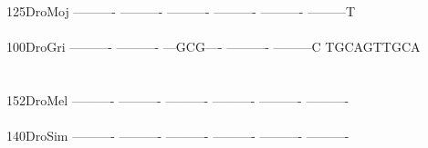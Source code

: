 \documentclass[11pt,twoside,reqno,a4paper]{article}
\begin{document}
{125\hspace*{2\charwidth}DroMoj	----------	----------	----------	----------	----------	---------T	\\
\hspace*{5\charwidth}\hspace*{7\charwidth}\hspace*{1\charwidth}\hspace*{1\charwidth}\hspace*{1\charwidth}\hspace*{1\charwidth}\hspace*{1\charwidth}\hspace*{1\charwidth}\\
100\hspace*{2\charwidth}DroGri	----------	----------	---GCG----	----------	---------C	TGCAGTTGCA	\\
\hspace*{5\charwidth}\hspace*{7\charwidth}\hspace*{1\charwidth}\hspace*{1\charwidth}\hspace*{1\charwidth}\hspace*{1\charwidth}\hspace*{1\charwidth}\hspace*{1\charwidth}\\
\\
152\hspace*{2\charwidth}DroMel	----------	----------	----------	----------	----------	----------	\\
\hspace*{5\charwidth}\hspace*{7\charwidth}\hspace*{1\charwidth}\hspace*{1\charwidth}\hspace*{1\charwidth}\hspace*{1\charwidth}\hspace*{1\charwidth}\hspace*{1\charwidth}\\
140\hspace*{2\charwidth}DroSim	----------	----------	----------	----------	----------	----------	\\
\hspace*{5\charwidth}\hspace*{7\charwidth}\hspace*{1\charwidth}\hspace*{1\charwidth}\hspace*{1\charwidth}\hspace*{1\charwidth}\hspace*{1\charwidth}\hspace*{1\charwidth}\\
}
\end{document}
